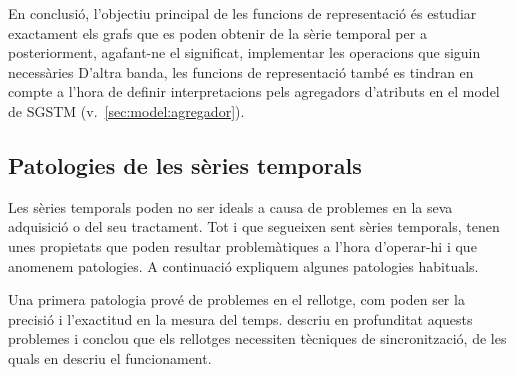 

En conclusió, l'objectiu principal de les funcions de representació és
estudiar exactament els grafs que es poden obtenir de la sèrie
temporal per a posteriorment, agafant-ne el significat, implementar
les operacions que siguin necessàries
D'altra banda, les funcions de representació també es tindran en
compte a l'hora de definir interpretacions pels agregadors d'atributs
en el model de \gls{SGSTM} (v.~\autoref{sec:model:agregador}).











\subsection{Patologies de les sèries temporals}
\label{sec:sgst:patologies}


Les sèries temporals poden no ser ideals a causa de problemes en la
seva adquisició o del seu tractament. Tot i que segueixen sent sèries
temporals, tenen unes propietats que poden resultar problemàtiques a
l'hora d'operar-hi i que anomenem patologies. A continuació expliquem
algunes patologies habituals.



Una primera patologia prové de problemes en el rellotge, com poden ser
la precisió i l'exactitud en la mesura del
temps. \textcite[cap.~3]{kopetz11:realtime} descriu en profunditat
aquests problemes i conclou que els rellotges necessiten tècniques de
sincronització, de les quals en descriu el funcionament.



